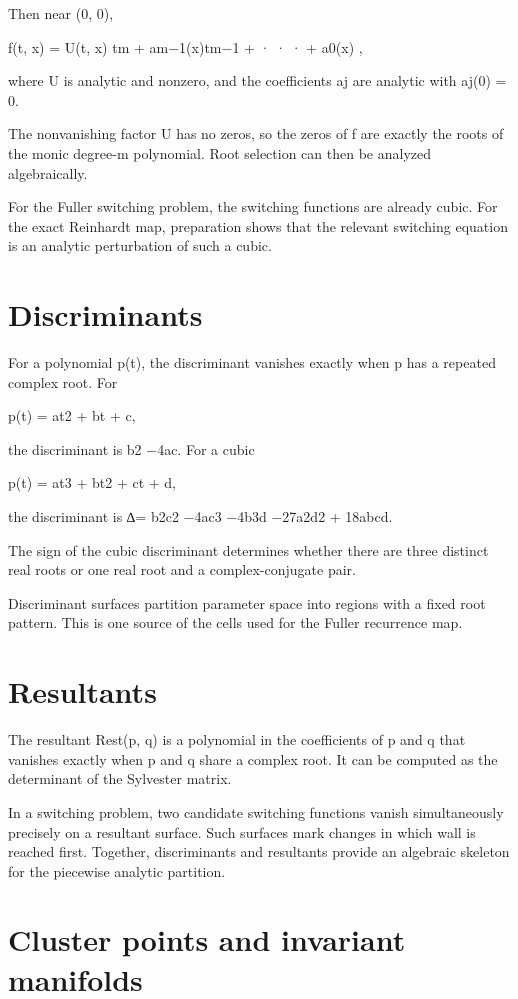 Then near (0, 0),


f(t, x) = U(t, x) tm + am−1(x)tm−1 + · · · + a0(x) ,


where U is analytic and nonzero, and the coefficients aj are analytic with aj(0) = 0.


The nonvanishing factor U has no zeros, so the zeros of f are exactly the roots of the monic degree-m polynomial. Root selection can then be analyzed algebraically.


For the Fuller switching problem, the switching functions are already cubic. For the exact Reinhardt map, preparation shows that the relevant switching equation is an analytic perturbation of such a cubic.


\section{Discriminants}

For a polynomial p(t), the discriminant vanishes exactly when p has a repeated complex root. For


p(t) = at2 + bt + c,


the discriminant is b2 −4ac. For a cubic


p(t) = at3 + bt2 + ct + d,


the discriminant is ∆= b2c2 −4ac3 −4b3d −27a2d2 + 18abcd.


The sign of the cubic discriminant determines whether there are three distinct real roots or one real root and a complex-conjugate pair.


Discriminant surfaces partition parameter space into regions with a fixed root pattern. This is one source of the cells used for the Fuller recurrence map.


\section{Resultants}

The resultant Rest(p, q) is a polynomial in the coefficients of p and q that vanishes exactly when p and q share a complex root. It can be computed as the determinant of the Sylvester matrix.


In a switching problem, two candidate switching functions vanish simultaneously precisely on a resultant surface. Such surfaces mark changes in which wall is reached first. Together, discriminants and resultants provide an algebraic skeleton for the piecewise analytic partition.


\section{Cluster points and invariant manifolds}

